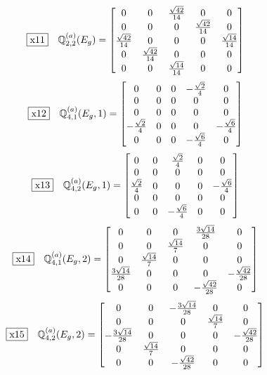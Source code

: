 \documentclass[fleqn,10pt,landscape]{jsarticle}
\begin{document}
\begin{dmath*}
\fbox{x11}\quad \mathbb{Q}_{2,2}^{(a)}(E_{g})=\begin{bmatrix} 0 & 0 & \frac{\sqrt{42}}{14} & 0 & 0 \\ 0 & 0 & 0 & \frac{\sqrt{42}}{14} & 0 \\ \frac{\sqrt{42}}{14} & 0 & 0 & 0 & \frac{\sqrt{14}}{14} \\ 0 & \frac{\sqrt{42}}{14} & 0 & 0 & 0 \\ 0 & 0 & \frac{\sqrt{14}}{14} & 0 & 0 \end{bmatrix}
\end{dmath*}
\begin{dmath*}
\fbox{x12}\quad \mathbb{Q}_{4,1}^{(a)}(E_{g},1)=\begin{bmatrix} 0 & 0 & 0 & - \frac{\sqrt{2}}{4} & 0 \\ 0 & 0 & 0 & 0 & 0 \\ 0 & 0 & 0 & 0 & 0 \\ - \frac{\sqrt{2}}{4} & 0 & 0 & 0 & - \frac{\sqrt{6}}{4} \\ 0 & 0 & 0 & - \frac{\sqrt{6}}{4} & 0 \end{bmatrix}
\end{dmath*}
\begin{dmath*}
\fbox{x13}\quad \mathbb{Q}_{4,2}^{(a)}(E_{g},1)=\begin{bmatrix} 0 & 0 & \frac{\sqrt{2}}{4} & 0 & 0 \\ 0 & 0 & 0 & 0 & 0 \\ \frac{\sqrt{2}}{4} & 0 & 0 & 0 & - \frac{\sqrt{6}}{4} \\ 0 & 0 & 0 & 0 & 0 \\ 0 & 0 & - \frac{\sqrt{6}}{4} & 0 & 0 \end{bmatrix}
\end{dmath*}
\begin{dmath*}
\fbox{x14}\quad \mathbb{Q}_{4,1}^{(a)}(E_{g},2)=\begin{bmatrix} 0 & 0 & 0 & \frac{3 \sqrt{14}}{28} & 0 \\ 0 & 0 & \frac{\sqrt{14}}{7} & 0 & 0 \\ 0 & \frac{\sqrt{14}}{7} & 0 & 0 & 0 \\ \frac{3 \sqrt{14}}{28} & 0 & 0 & 0 & - \frac{\sqrt{42}}{28} \\ 0 & 0 & 0 & - \frac{\sqrt{42}}{28} & 0 \end{bmatrix}
\end{dmath*}
\begin{dmath*}
\fbox{x15}\quad \mathbb{Q}_{4,2}^{(a)}(E_{g},2)=\begin{bmatrix} 0 & 0 & - \frac{3 \sqrt{14}}{28} & 0 & 0 \\ 0 & 0 & 0 & \frac{\sqrt{14}}{7} & 0 \\ - \frac{3 \sqrt{14}}{28} & 0 & 0 & 0 & - \frac{\sqrt{42}}{28} \\ 0 & \frac{\sqrt{14}}{7} & 0 & 0 & 0 \\ 0 & 0 & - \frac{\sqrt{42}}{28} & 0 & 0 \end{bmatrix}
\end{dmath*}
\end{document}
